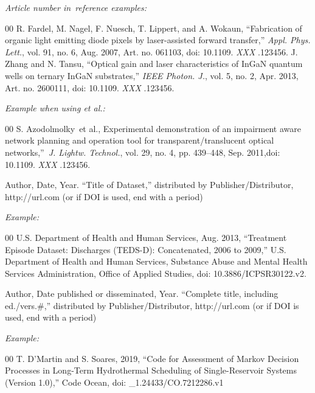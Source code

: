 \documentclass{ieeetmlcn}
\begin{document}
{\it Article number in~reference examples:}

\begin{thebibliography}{00}
 R. Fardel, M. Nagel, F. Nuesch, T. Lippert, and A. Wokaun, ``Fabrication of organic light emitting diode pixels by laser-assisted forward transfer,'' {\it Appl. Phys. Lett.}, vol. 91, no. 6, Aug. 2007, Art. no. 061103, doi:  {10.1109.} {{\it XXX}} {.123456}.
 J. Zhang and N. Tansu, ``Optical gain and laser characteristics of InGaN quantum wells on ternary InGaN substrates,'' {\it IEEE Photon. J.}, vol. 5, no. 2, Apr. 2013, Art. no. 2600111, doi:  {10.1109.} {{\it XXX}} {.123456}.
\end{thebibliography}

{\it Example when using \textit{et al.}:}

\begin{thebibliography}{00}
 S. Azodolmolky~{{et al.}}, Experimental demonstration of an impairment aware network planning and operation tool for transparent/translucent optical networks,''~{\it J. Lightw. Technol.}, vol. 29, no. 4, pp. 439--448, Sep. 2011,doi:  {10.1109.} {{\it XXX}} {.123456}.
\end{thebibliography}


\noindent Author,  Date, Year. ``Title of Dataset,'' distributed by Publisher/Distributor, http://url.com (or if DOI is used, end with a period)

{\it Example:}

\begin{thebibliography}{00}
 U.S. Department of Health and Human Services, Aug. 2013, ``Treatment Episode Dataset: Discharges (TEDS-D): Concatenated, 2006 to 2009,'' U.S. Department of Health and Human Services, Substance Abuse and Mental Health Services Administration, Office of Applied Studies, doi: 10.3886/ICPSR30122.v2.
\end{thebibliography}


\noindent Author,  Date published or disseminated, Year. ``Complete title, including ed./vers.\#,'' distributed by Publisher/Distributor, http://url.com (or if DOI is used, end with a period)

{\it Example:}

\begin{thebibliography}{00}
 T. D'Martin and S. Soares, 2019, ``Code for Assessment of Markov Decision Processes in Long-Term Hydrothermal Scheduling of Single-Reservoir Systems (Version 1.0),'' Code Ocean, doi: \_1.24433/CO.7212286.v1
\end{thebibliography}
\end{document}
